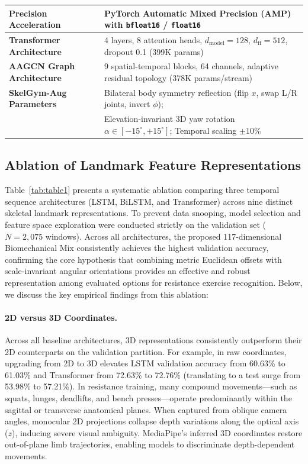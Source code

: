 \documentclass[preprint,12pt]{elsarticle}
\begin{document}
\begin{table}[!t]
{\begin{tabular}{l l}
\textbf{Precision Acceleration}    & PyTorch Automatic Mixed Precision (AMP) with \texttt{bfloat16} / \texttt{float16} \\
\midrule
\textbf{Transformer Architecture}  & 4 layers, 8 attention heads, $d_{\text{model}} = 128$, $d_{\text{ff}} = 512$, dropout 0.1 (399K params) \\
\textbf{AAGCN Graph Architecture}  & 9 spatial-temporal blocks, 64 channels, adaptive residual topology (378K params/stream) \\
\textbf{SkelGym-Aug Parameters}    & Bilateral body symmetry reflection (flip $x$, swap L/R joints, invert $\phi$); \\
                                   & Elevation-invariant 3D yaw rotation $\alpha \in [-15^\circ, +15^\circ]$; Temporal scaling $\pm 10\%$ \\
\bottomrule
\end{tabular}
}
\end{table}

\subsection{Ablation of Landmark Feature Representations}
Table~\ref{tab:table1} presents a systematic ablation comparing three temporal sequence architectures (LSTM, BiLSTM, and Transformer) across nine distinct skeletal landmark representations. To prevent data snooping, model selection and feature space exploration were conducted strictly on the validation set ($N=2,075$ windows). Across all architectures, the proposed 117-dimensional Biomechanical Mix consistently achieves the highest validation accuracy, confirming the core hypothesis that combining metric Euclidean offsets with scale-invariant angular orientations provides an effective and robust representation among evaluated options for resistance exercise recognition. Below, we discuss the key empirical findings from this ablation:

\paragraph{2D versus 3D Coordinates.} Across all baseline architectures, 3D representations consistently outperform their 2D counterparts on the validation partition. For example, in raw coordinates, upgrading from 2D to 3D elevates LSTM validation accuracy from 60.63\% to 61.03\% and Transformer from 72.63\% to 72.76\% (translating to a test surge from 53.98\% to 57.21\%). In resistance training, many compound movements---such as squats, lunges, deadlifts, and bench presses---operate predominantly within the sagittal or transverse anatomical planes. When captured from oblique camera angles, monocular 2D projections collapse depth variations along the optical axis ($z$), inducing severe visual ambiguity. MediaPipe's inferred 3D coordinates restore out-of-plane limb trajectories, enabling models to discriminate depth-dependent movements.
\end{document}
